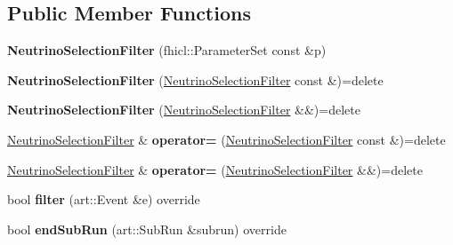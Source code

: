 \subsection*{Public Member Functions}
\begin{DoxyCompactItemize}
\item 
{\bfseries Neutrino\+Selection\+Filter} (fhicl\+::\+Parameter\+Set const \&p)\hypertarget{classNeutrinoSelectionFilter_adb0e654d928530db4d15774bf087f20e}{}\label{classNeutrinoSelectionFilter_adb0e654d928530db4d15774bf087f20e}

\item 
{\bfseries Neutrino\+Selection\+Filter} (\hyperlink{classNeutrinoSelectionFilter}{Neutrino\+Selection\+Filter} const \&)=delete\hypertarget{classNeutrinoSelectionFilter_a63f661621e76ad30756e4ef1b2d54a9d}{}\label{classNeutrinoSelectionFilter_a63f661621e76ad30756e4ef1b2d54a9d}

\item 
{\bfseries Neutrino\+Selection\+Filter} (\hyperlink{classNeutrinoSelectionFilter}{Neutrino\+Selection\+Filter} \&\&)=delete\hypertarget{classNeutrinoSelectionFilter_aa32241ed5db76e990a8a36055413c78a}{}\label{classNeutrinoSelectionFilter_aa32241ed5db76e990a8a36055413c78a}

\item 
\hyperlink{classNeutrinoSelectionFilter}{Neutrino\+Selection\+Filter} \& {\bfseries operator=} (\hyperlink{classNeutrinoSelectionFilter}{Neutrino\+Selection\+Filter} const \&)=delete\hypertarget{classNeutrinoSelectionFilter_a49e2154a532eaa0f50270299b90c5bce}{}\label{classNeutrinoSelectionFilter_a49e2154a532eaa0f50270299b90c5bce}

\item 
\hyperlink{classNeutrinoSelectionFilter}{Neutrino\+Selection\+Filter} \& {\bfseries operator=} (\hyperlink{classNeutrinoSelectionFilter}{Neutrino\+Selection\+Filter} \&\&)=delete\hypertarget{classNeutrinoSelectionFilter_a487b0e18767f6cee88556b38f3ddff3d}{}\label{classNeutrinoSelectionFilter_a487b0e18767f6cee88556b38f3ddff3d}

\item 
bool {\bfseries filter} (art\+::\+Event \&e) override\hypertarget{classNeutrinoSelectionFilter_a397e90eb7ce59516d4f7ba2338e40f6c}{}\label{classNeutrinoSelectionFilter_a397e90eb7ce59516d4f7ba2338e40f6c}

\item 
bool {\bfseries end\+Sub\+Run} (art\+::\+Sub\+Run \&subrun) override\hypertarget{classNeutrinoSelectionFilter_a4943f71896ecf37591c9273e402b2ade}{}\label{classNeutrinoSelectionFilter_a4943f71896ecf37591c9273e402b2ade}

\end{DoxyCompactItemize}
